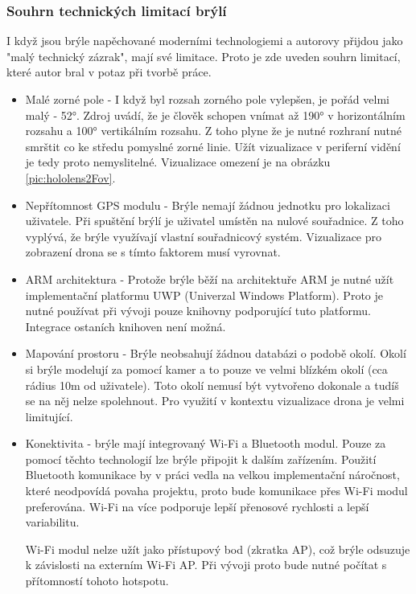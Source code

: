 \subsubsection{Souhrn technických limitací brýlí}
I když jsou brýle napěchované moderními technologiemi a autorovy přijdou jako "malý technický zázrak", mají své limitace. Proto je zde uveden souhrn limitací, které autor bral v potaz při tvorbě práce. 
\begin{itemize}
    \item Malé zorné pole - I když byl rozsah zorného pole vylepšen, je pořád velmi malý - 52°.  Zdroj \cite{HumanEye} uvádí, že je člověk schopen vnímat až 190° v horizontálním rozsahu a 100° vertikálním rozsahu. Z toho plyne že je nutné rozhraní nutné smrštit co ke středu pomyslné zorné linie. Užít vizualizace v periferní vidění je tedy proto nemyslitelné. Vizualizace omezení je na obrázku \ref{pic:hololens2Fov}.
    \item Nepřítomnost GPS modulu - Brýle nemají žádnou jednotku pro lokalizaci uživatele. Při spuštění brýlí je uživatel umístěn na nulové souřadnice. Z toho vyplývá, že brýle využívají vlastní souřadnicový systém. Vizualizace pro zobrazení drona se s tímto faktorem musí vyrovnat.
    \item ARM architektura - Protože brýle běží na architektuře ARM je nutné užít implementační platformu UWP (Univerzal Windows Platform). Proto je nutné používat při vývoji pouze knihovny podporující tuto platformu. Integrace ostaních knihoven není možná.
    \item Mapování prostoru - Brýle neobsahují žádnou databázi o podobě okolí. Okolí si brýle modelují za pomocí kamer a to pouze ve velmi blízkém okolí (cca rádius 10m od uživatele). Toto okolí nemusí být vytvořeno dokonale a tudíš se na něj nelze spolehnout. Pro využití v kontextu vizualizace drona je velmi limitující.
    \item Konektivita - brýle mají integrovaný Wi-Fi a Bluetooth modul. Pouze za pomocí těchto technologií lze brýle připojit k dalším zařízením. Použití Bluetooth komunikace by v práci vedla na velkou implementační náročnost, které neodpovídá povaha projektu, proto bude komunikace přes Wi-Fi modul preferována. Wi-Fi na více podporuje lepší přenosové rychlosti a lepší variabilitu. 
    
    Wi-Fi modul nelze užít jako přístupový bod (zkratka AP), což brýle odsuzuje k závislosti na externím Wi-Fi AP. Při vývoji proto bude nutné počítat s přítomností tohoto hotspotu. 
\end{itemize}
